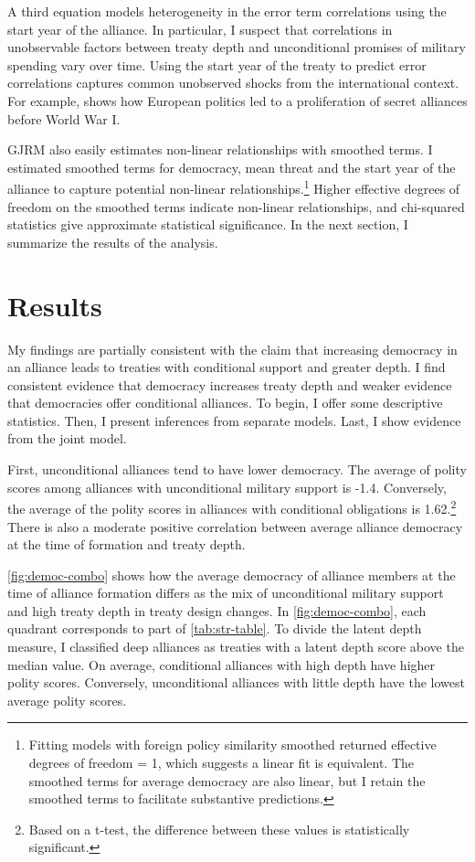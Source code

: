 \documentclass[12pt]{article}
\begin{document}
A third equation models heterogeneity in the error term correlations using the start year of the alliance. 
In particular, I suspect that correlations in unobservable factors between treaty depth and unconditional promises of military spending vary over time. 
Using the start year of the treaty to predict error correlations captures common unobserved shocks from the international context. 
For example, \citet{Kuo2019} shows how European politics led to a proliferation of secret alliances before World War I. 


GJRM also easily estimates non-linear relationships with smoothed terms. 
I estimated smoothed terms for democracy, mean threat and the start year of the alliance to capture potential non-linear relationships.\footnote{Fitting models with foreign policy similarity smoothed returned effective degrees of freedom = 1, which suggests a linear fit is equivalent. The smoothed terms for average democracy are also linear, but I retain the smoothed terms to facilitate substantive predictions.}  
Higher effective degrees of freedom on the smoothed terms indicate non-linear relationships, and chi-squared statistics give approximate statistical significance. 
In the next section, I summarize the results of the analysis. 



\section{Results}


My findings are partially consistent with the claim that increasing democracy in an alliance leads to treaties with conditional support and greater depth. 
I find consistent evidence that democracy increases treaty depth and weaker evidence that democracies offer conditional alliances. 
To begin, I offer some descriptive statistics.
Then, I present inferences from separate models. 
Last, I show evidence from the joint model. 


First, unconditional alliances tend to have lower democracy. 
The average of polity scores among alliances with unconditional military support is -1.4. 
Conversely, the average of the polity scores in alliances with conditional obligations is 1.62.\footnote{Based on a t-test, the difference between these values is statistically significant.} 
There is also a moderate positive correlation between average alliance democracy at the time of formation and treaty depth. 


\autoref{fig:democ-combo} shows how the average democracy of alliance members at the time of alliance formation differs as the mix of unconditional military support and high treaty depth in treaty design changes.
In \autoref{fig:democ-combo}, each quadrant corresponds to part of \autoref{tab:str-table}.
To divide the latent depth measure, I classified deep alliances as treaties with a latent depth score above the median value. 
On average, conditional alliances with high depth have higher polity scores. 
Conversely, unconditional alliances with little depth have the lowest average polity scores. 
\end{document}
